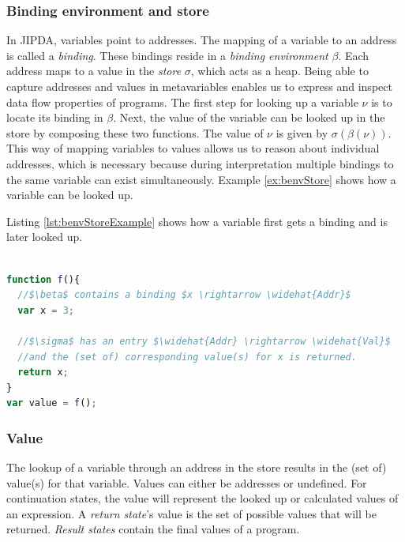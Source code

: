 \subsubsection*{Binding environment and store}

In JIPDA, variables point to addresses. The mapping of a variable to an address is called a \textit{binding}. These bindings reside in a \textit{binding environment} $\beta$. Each address maps to a value in the \textit{store} $\sigma$, which acts as a heap. Being able to capture addresses and values in metavariables enables us to express and inspect data flow properties of programs. The first step for looking up a variable $\nu$ is to locate its binding in $\beta$. Next, the value of the variable can be looked up in the store by composing these two functions. The value of $\nu$ is given by $\sigma(\beta(\nu))$. This way of mapping variables to values allows us to reason about individual addresses, which is necessary because during interpretation multiple bindings to the same variable can exist simultaneously. Example \ref{ex:benvStore} shows how a variable can be looked up.
\begin{exmp}
Listing \ref{lst:benvStoreExample} shows how a variable first gets a binding and is later looked up.
\\
\begin{lstlisting}[label={lst:benvStoreExample},language=JavaScript,caption=Example of the binding environment and store workings, mathescape=true]  % float=t?

function f(){
  //$\beta$ contains a binding $x \rightarrow \widehat{Addr}$
  var x = 3; 
  
  //$\sigma$ has an entry $\widehat{Addr} \rightarrow \widehat{Val}$
  //and the (set of) corresponding value(s) for x is returned. 
  return x;
}
var value = f();
\end{lstlisting}
\end{exmp}


\subsubsection*{Value}
The lookup of a variable through an address in the store results in the (set of) value(s) for that variable. Values can either be addresses or undefined. For continuation states, the value will represent the looked up or calculated values of an expression. A \textit{return state}'s value is the set of possible values that will be returned. \textit{Result states} contain the final values of a program.

